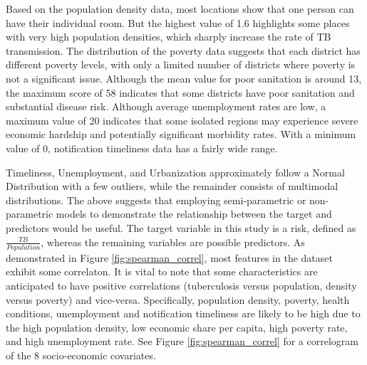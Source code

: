 Based on the population density data, most locations show that one person can have their individual room. But the highest value of 1.6 highlights some places with very high population densities, which sharply increase the rate of TB transmission. The distribution of the poverty data suggests that each district has different poverty levels, with only a limited number of districts where poverty is not a significant issue. Although the mean value for poor sanitation is around 13, the maximum score of 58 indicates that some districts have poor sanitation and substantial disease risk. Although average unemployment rates are low, a maximum value of 20 indicates that some isolated regions may experience severe economic hardship and potentially significant morbidity rates. With a minimum value of 0, notification timeliness data has a fairly wide range.

Timeliness, Unemployment, and Urbanization approximately follow a Normal Distribution with a few outliers, while the remainder consists of multimodal distributions. The above suggests that employing semi-parametric or non-parametric models to demonstrate the relationship between the target and predictors would be useful. The target variable in this study is a risk, defined as $\frac{TB}{Population}$, whereas the remaining variables are possible predictors. As demonstrated in Figure \ref{fig:spearman_correl}, most features in the dataset exhibit some correlaton. It is vital to note that some characteristics are anticipated to have positive correlations (tuberculosis versus population, density versus poverty) and vice-versa. Specifically, population density, poverty, health conditions, unemployment and notification timeliness are likely to be high due to the high population density, low economic share per capita, high poverty rate, and high unemployment rate. See Figure \ref{fig:spearman_correl} for a correlogram of the 8 socio-economic covariates.